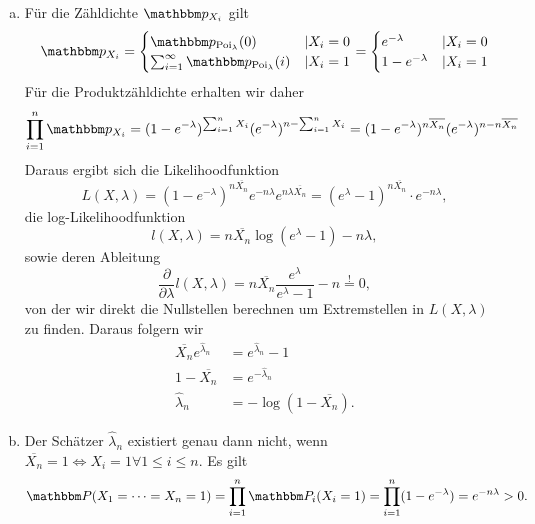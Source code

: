 \documentclass[uebung]{lecture}
\begin{document}
\begin{aufgabe}
    \begin{enumerate}[(a)]
        \item Für die Zähldichte $\mathbbm p_{X_i}$ gilt
        \[
            \mathbbm p_{X_i} = \begin{cases}
                \mathbbm p_{\text{Poi}_\lambda}(0) &| X_i = 0\\
                \sum_{i = 1}^{\infty} \mathbbm p_{\text{Poi}_\lambda}(i) &| X_i = 1
            \end{cases}  = \begin{cases}
                e^{-\lambda} & |X_i = 0\\
                1 - e^{-\lambda} & | X_i = 1
            \end{cases}
        \]
        Für die Produktzähldichte erhalten wir daher
        \[
            \prod_{i=1}^n \mathbbm p_{X_i} = (1 - e^{-\lambda})^{\sum_{i = 1}^{n} X_i} (e^{-\lambda})^{n - \sum_{i = 1}^{n} X_i}
            = (1 - e^{-\lambda})^{n \overline{X_n}} (e^{-\lambda})^{n - n \overline{X_n}}
        \]
        Daraus ergibt sich die Likelihoodfunktion
        \[
            L(X, \lambda) = (1 - e^{-\lambda})^{n \overline{X_n}} e^{-n\lambda} e^{n \lambda \overline{X_n}} = (e^{\lambda} - 1)^{n \overline{X_n}} \cdot e^{-n\lambda},
        \]
        die log-Likelihoodfunktion
        \[
            l(X,\lambda) = n \overline{X_n} \log(e^\lambda - 1) - n\lambda,
        \]  
        sowie deren Ableitung
        \[
            \frac{\partial}{\partial \lambda}  l(X, \lambda) = n \overline{X_n} \frac{e^\lambda}{e^\lambda - 1} - n \overset{!}{=} 0,
        \]
        von der wir direkt die Nullstellen berechnen um Extremstellen in $L(X, \lambda)$ zu finden.
        Daraus folgern wir
        \begin{align*}
            \overline{X_n} e^{\hat \lambda_n} &= e^{\hat \lambda_n} - 1\\
            1 - \overline{X_n}  &= e^{-\hat \lambda_n}\\
            \hat \lambda_n &= -\log(1 - \overline{X_n}).
        \end{align*}
        \item Der Schätzer $ \hat \lambda_n$ existiert genau dann nicht, wenn $\overline{X_n} = 1 \Leftrightarrow X_i = 1 \forall 1\le i\le n$. Es gilt 
        \[ 
            \mathbbm P(X_1 = \dots = X_n = 1) = \prod_{i=1}^n \mathbbm P_i(X_i = 1) = \prod_{i=1}^n (1 - e^{-\lambda}) = e^{-n\lambda} > 0.
        \]
    \end{enumerate}
\end{aufgabe}
\end{document}
